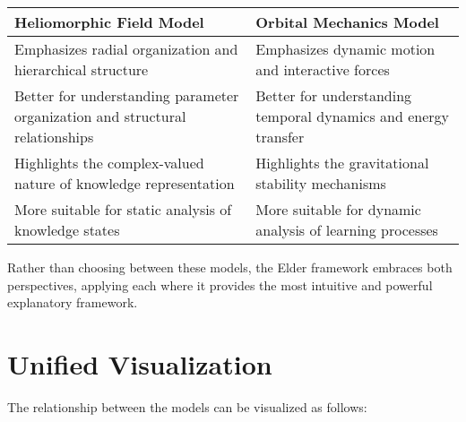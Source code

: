 \begin{tcolorbox}[colback=TheoremBlue, colframe=DarkSkyBlue, title=Complementary Model Strengths, fonttitle=\bfseries\large]
\begin{tabular}{p{} | p{}}
\textbf{Heliomorphic Field Model} & \textbf{Orbital Mechanics Model} \\
\hline
Emphasizes radial organization and hierarchical structure & Emphasizes dynamic motion and interactive forces \\
\hline
Better for understanding parameter organization and structural relationships & Better for understanding temporal dynamics and energy transfer \\
\hline
Highlights the complex-valued nature of knowledge representation & Highlights the gravitational stability mechanisms \\
\hline
More suitable for static analysis of knowledge states & More suitable for dynamic analysis of learning processes \\
\end{tabular}
\end{tcolorbox}

Rather than choosing between these models, the Elder framework embraces both perspectives, applying each where it provides the most intuitive and powerful explanatory framework.

\section{Unified Visualization}

The relationship between the models can be visualized as follows:

